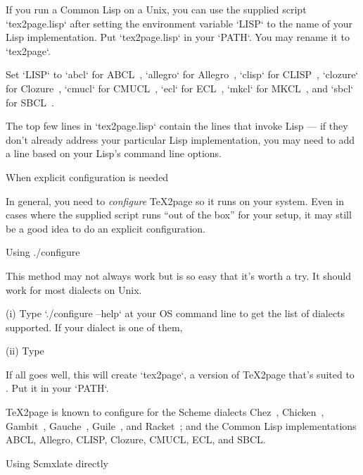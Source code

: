 If you run a Common Lisp on a Unix, you can use the supplied script
`tex2page.lisp` after setting the environment variable `LISP` to the
name of your Lisp implementation.  Put `tex2page.lisp` in your
`PATH`. You may rename it to
`tex2page`.

Set `LISP` to
`abcl` for ABCL~\cite{abcl},
`allegro` for Allegro~\cite{allegro},
`clisp` for CLISP~\cite{clisp},
`clozure` for Clozure~\cite{clozure},
`cmucl` for CMUCL~\cite{cmucl},
`ecl` for ECL~\cite{ecl},
`mkcl` for MKCL~\cite{mkcl},
and `sbcl` for SBCL~\cite{sbcl}.

The top few lines in `tex2page.lisp` contain the lines
that invoke Lisp —  if they don’t already address your
particular Lisp
implementation, you may need to add a line based on your
Lisp’s command line options.

\beginsection When explicit configuration is needed

%
In general, you need to {\em
configure}
\TeX2page so it runs on your system.  Even in cases where the supplied
script runs “out of the box” for your setup, it may still be a good
idea to do an explicit configuration.

\beginsection Using {./configure}

This method may not always work but is so easy that
it’s worth a try.  It should work for most
dialects on Unix.

\item(i) Type `./configure --help` at your OS command line
to get the list of dialects supported.
If your dialect  is one of them,

\item(ii) Type  

\n If all goes well, this will create
`tex2page`, a version of \TeX2page that’s suited to .
Put it in your `PATH`.

\TeX2page is known to configure for the Scheme dialects
Chez~\cite{chez},
Chicken~\cite{chicken},
Gambit~\cite{gambit},
Gauche~\cite{gauche},
Guile~\cite{guile},
and Racket~\cite{racket}; and the Common Lisp
implementations ABCL, Allegro, CLISP, Clozure, CMUCL, ECL, and SBCL.
\iffalse how about bigloo mitscheme pocketscheme s48 scm scsh
stklos sxm \fi

\beginsection  Using Scmxlate directly

